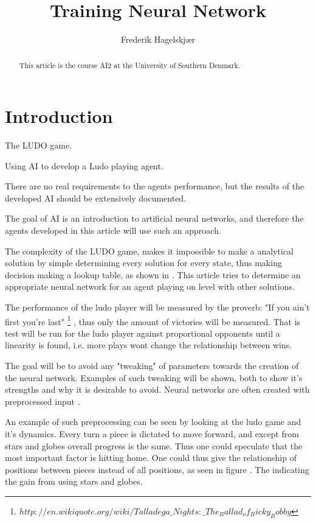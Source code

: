 \documentclass{llncs}
\begin{document}
\title{Training Neural Network}
\author{Frederik Hagelskjær}
\maketitle

\begin{abstract}

This article is the course AI2 at the University of Southern Denmark. 

\end{abstract}

\section*{Introduction} %

The LUDO game. 

Using AI to develop a Ludo playing agent. 

There are no real requirements to the agents performance, but the results of the developed AI should be extensively documented. 

The goal of AI is an introduction to artificial neural networks, and therefore the agents developed in this article will use such an approach.

The complexity of the LUDO game, makes it impossible to make a analytical solution by simple determining every solution for every state, thus making decision making a lookup table, as shown in \cite{6031999}. This article tries to determine an appropriate neural network for an agent playing on level with other solutions.

The performance of the ludo player will be measured by the proverb: "If you ain't first you're last" \footnote{ $http://en.wikiquote.org/wiki/Talladega\_Nights:\_The_Ballad_of_Ricky_Bobby$}
, thus only the amount of victories will be measured. That is test will be run for the ludo player against proportional opponents until a linearity is found, i.e. more plays wont change the relationship between wins.

The goal will be to avoid any "tweaking" of parameters towards the creation of the neural network. Examples of such tweaking will be shown, both to show it's strengths and why it is desirable to avoid. Neural networks are often created with preprocessed input \cite{NeuronOnline}. 

An example of such preprocessing can be seen by looking at the ludo game and it's dynamics. Every turn a piece is dictated to move forward, and except from stars and globes overall progress is the same. Thus one could speculate that the most important factor is hitting home. One could thus give the relationship  of positions between pieces instead of all positions, as seen in figure%
. The indicating the gain from using stars and globes.
\end{document}
